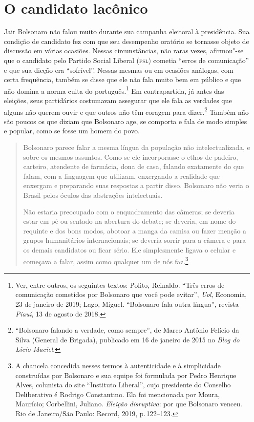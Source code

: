 \section{O candidato lacônico}

Jair Bolsonaro não falou muito durante sua campanha eleitoral à
presidência. Sua condição de candidato fez com que seu desempenho
oratório se tornasse objeto de discussão em várias ocasiões. Nessas
circunstâncias, não raras vezes, afirmou"-se que o candidato pelo Partido
Social Liberal (\textsc{psl}) cometia ``erros de comunicação'' e que sua dicção
era ``sofrível''. Nessas mesmas ou em ocasiões análogas, com certa
frequência, também se disse que ele não fala muito bem em público e que
não domina a norma culta do português.\footnote{Ver, entre outros, os
  seguintes textos: Polito, Reinaldo. ``Três erros de comunicação
  cometidos por Bolsonaro que você pode evitar'', \textit{Uol}, Economia, 23 de janeiro de 2019; Lago, Miguel. ``Bolsonaro fala outra língua'', revista \textit{Piauí}, 13 de agosto de 2018.} Em contrapartida, já antes das eleições, seus partidários
costumavam assegurar que ele fala as verdades que alguns não querem
ouvir e que outros não têm coragem para dizer.\footnote{``Bolsonaro
  falando a verdade, como sempre'', de Marco Antônio Felício da Silva
  (General de Brigada), publicado em 16 de janeiro de 2015 no
  \emph{Blog do Licio Maciel}.}
Também não são poucos os que diziam que Bolsonaro age, se comporta e
fala de modo simples e popular, como se fosse um homem do povo.

\begin{quote}
Bolsonaro parece falar a mesma língua da população não intelectualizada,
e sobre os mesmos assuntos. Como se ele incorporasse o ethos de padeiro,
carteiro, atendente de farmácia, dona de casa, falando exatamente do que
falam, com a linguagem que utilizam, enxergando a realidade que enxergam
e preparando suas respostas a partir disso. Bolsonaro não veria o Brasil
pelos óculos das abstrações intelectuais.

Não estaria preocupado com o enquadramento das câmeras; se deveria estar
em pé ou sentado na abertura do debate; se deveria, em nome do requinte
e dos bons modos, abotoar a manga da camisa ou fazer menção a grupos
humanitários internacionais; se deveria sorrir para a câmera e para os
demais candidatos ou ficar sério. Ele simplesmente ligava o celular e
começava a falar, assim como qualquer um de nós faz.\footnote{A
  chancela concedida nesses termos à autenticidade e à simplicidade
  construídas por Bolsonaro e sua equipe foi formulada por Pedro
  Henrique Alves, colunista do site ``Instituto Liberal'', cujo
  presidente do Conselho Deliberativo é Rodrigo Constantino. Ela foi
  mencionada por Moura, Maurício; Corbellini, Juliano. \emph{Eleição
  disruptiva}: por que Bolsonaro venceu. Rio de Janeiro/São Paulo:
  Record, 2019, p.\,122--123.}
\end{quote}

